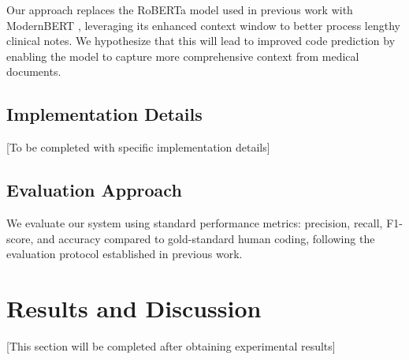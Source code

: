 \documentclass[
  authoryear,
  preprint]{elsarticle}
\begin{document}
Our approach replaces the RoBERTa model used in previous work
\citep{edin2024explainable} with ModernBERT
\citep{warner2024modernbert}, leveraging its enhanced context window to
better process lengthy clinical notes. We hypothesize that this will
lead to improved code prediction by enabling the model to capture more
comprehensive context from medical documents.

\subsection{Implementation Details}\label{implementation-details}

{[}To be completed with specific implementation details{]}

\subsection{Evaluation Approach}\label{evaluation-approach}

We evaluate our system using standard performance metrics: precision,
recall, F1-score, and accuracy compared to gold-standard human coding,
following the evaluation protocol established in previous work.

\section{Results and Discussion}\label{results-and-discussion}

{[}This section will be completed after obtaining experimental
results{]}


\renewcommand\refname{References}
  
\end{document}
